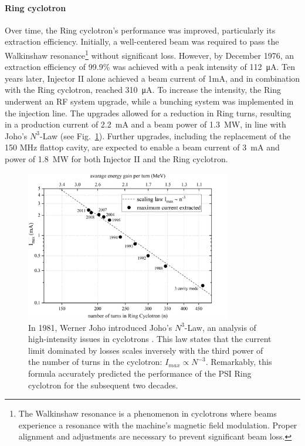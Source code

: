 \begin{refsection}
        \paragraph{Ring cyclotron}
        Over time, the Ring cyclotron's performance was improved, particularly its extraction efficiency. 
        Initially, a well-centered beam was required to pass the Walkinshaw resonance\footnote{The Walkinshaw resonance is a phenomenon in cyclotrons where beams experience a resonance with the machine's magnetic field modulation. Proper alignment and adjustments are necessary to prevent significant beam loss.} without significant loss.
        However, by December 1976, an extraction efficiency of 99.9\% was achieved with a peak intensity of \SI{112}{\micro A}. 
        Ten years later, Injector II alone achieved a beam current of 1mA, and in combination with the Ring cyclotron, reached \SI{310}{\micro A}.
        To increase the intensity, the Ring underwent an RF system upgrade, while a bunching system was implemented in the injection line. 
        The upgrades allowed for a reduction in Ring turns, resulting in a production current of \SI{2.2}{mA} and a beam power of \SI{1.3}{MW}, in line with Joho's $N^3$-Law (see Fig.~\ref{fig:PSI:HIPA:joho}). 
        Further upgrades, including the replacement of the 150 MHz flattop cavity, are expected to enable a beam current of \SI{3}{mA} and power of \SI{1.8}{MW} for both Injector II and the Ring cyclotron.
        \begin{figure}
            \centering
            \includegraphics[width = 0.8\textwidth]{Figures/Introduction/PSI_HIPA_joho.png}
            \caption[John's $N^3$-Law for maximum current in a cyclotron]{In 1981, Werner Joho introduced Joho's $N^3$-Law, an analysis of high-intensity issues in cyclotrons \cite{joho}. This law states that the current limit dominated by losses scales inversely with the third power of the number of turns in the cyclotron: $I_{max}\propto N^{-3}$. Remarkably, this formula accurately predicted the performance of the PSI Ring cyclotron for the subsequent two decades.}
            \label{fig:PSI:HIPA:joho}
        \end{figure}
        

\end{refsection}
